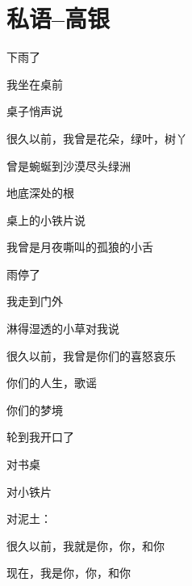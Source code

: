\section{私语--高银}

下雨了

我坐在桌前

桌子悄声说

很久以前，我曾是花朵，绿叶，树丫

曾是蜿蜒到沙漠尽头绿洲

地底深处的根

桌上的小铁片说

我曾是月夜嘶叫的孤狼的小舌

雨停了

我走到门外

淋得湿透的小草对我说

很久以前，我曾是你们的喜怒哀乐

你们的人生，歌谣

你们的梦境

轮到我开口了

对书桌

对小铁片

对泥土：

很久以前，我就是你，你，和你

现在，我是你，你，和你
